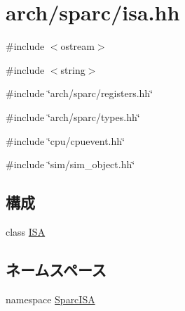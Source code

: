 \hypertarget{sparc_2isa_8hh}{
\section{arch/sparc/isa.hh}
\label{sparc_2isa_8hh}
}
{\ttfamily \#include $<$ostream$>$}\par
{\ttfamily \#include $<$string$>$}\par
{\ttfamily \#include \char`\"{}arch/sparc/registers.hh\char`\"{}}\par
{\ttfamily \#include \char`\"{}arch/sparc/types.hh\char`\"{}}\par
{\ttfamily \#include \char`\"{}cpu/cpuevent.hh\char`\"{}}\par
{\ttfamily \#include \char`\"{}sim/sim\_\-object.hh\char`\"{}}\par
\subsection*{構成}
\begin{DoxyCompactItemize}
\item 
class \hyperlink{classSparcISA_1_1ISA}{ISA}
\end{DoxyCompactItemize}
\subsection*{ネームスペース}
\begin{DoxyCompactItemize}
\item 
namespace \hyperlink{namespaceSparcISA}{SparcISA}
\end{DoxyCompactItemize}

